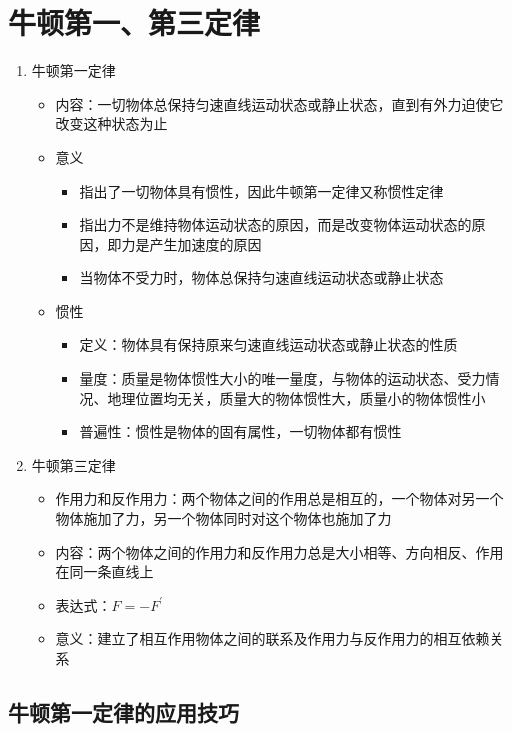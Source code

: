 \documentclass[cn,11pt]{elegantbook}
\begin{document}
\chapter{牛顿第一、第三定律}
\begin{enumerate}
   \item 牛顿第一定律
   \begin{itemize}
      \item 内容：一切物体总保持匀速直线运动状态或静止状态，直到有外力迫使它改变这种状态为止
      \item 意义
      \begin{itemize}
         \item 指出了一切物体具有惯性，因此牛顿第一定律又称惯性定律
         \item 指出力不是维持物体运动状态的原因，而是改变物体运动状态的原因，即力是产生加速度的原因
         \item 当物体不受力时，物体总保持匀速直线运动状态或静止状态
      \end{itemize}
      \item 惯性
      \begin{itemize}
         \item 定义：物体具有保持原来匀速直线运动状态或静止状态的性质
         \item 量度：质量是物体惯性大小的唯一量度，与物体的运动状态、受力情况、地理位置均无关，质量大的物体惯性大，质量小的物体惯性小
         \item 普遍性：惯性是物体的固有属性，一切物体都有惯性
      \end{itemize}
   \end{itemize}
   \item 牛顿第三定律
   \begin{itemize}
      \item 作用力和反作用力：两个物体之间的作用总是相互的，一个物体对另一个物体施加了力，另一个物体同时对这个物体也施加了力
      \item 内容：两个物体之间的作用力和反作用力总是大小相等、方向相反、作用在同一条直线上
      \item 表达式：$F=-F^{\prime}$
      \item 意义：建立了相互作用物体之间的联系及作用力与反作用力的相互依赖关系
   \end{itemize}
\end{enumerate}

\section{牛顿第一定律的应用技巧}
\end{document}

